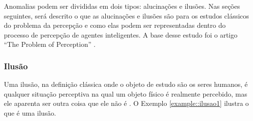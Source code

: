 Anomalias podem ser divididas em dois tipos: alucinações e ilusões. Nas seções seguintes, será descrito o que as alucinações e ilusões são para os estudos clássicos do problema da percepção \cite{Russell1912-RUSTPO-49} \cite{Price1933-PRIP-20} e como elas podem ser representadas dentro do processo de percepção de agentes inteligentes. A base desse estudo foi o artigo ``The Problem of Perception'' \cite{perception-problem}.

\subsubsection{Ilusão}

Uma ilusão, na definição clássica onde o objeto de estudo são os seres humanos, é qualquer situação perceptiva na qual um objeto físico é realmente percebido, mas ele aparenta ser outra coisa que ele não é \cite{Smith2002-SMITPO-17}. O Exemplo \ref{example::ilusao1} ilustra o que é uma ilusão.


